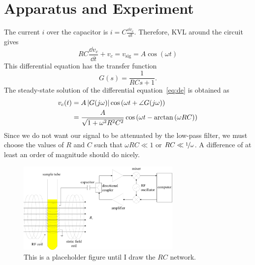 \section{Apparatus and Experiment}

The current $i$ over the capacitor is $i = C\frac{\dd v_c}{\dd t}$. Therefore,
KVL around the circuit gives 
%
\begin{equation}
    RC\frac{\dd v_c}{\dd t} + v_c = v_{\text{sig}} = A \cos{(\omega t)}
    \label{eq:de}
\end{equation} 
%
This differential equation has the transfer function \[ G(s) = \frac{1}
{RCs+1}. \] The steady-state solution of the differential equation~\eqref{eq:de}
is obtained as
%
\begin{align}
    \begin{split}
    v_c(t) &= A\left|{G(j \omega)}\right|\cos{(\omega t + \angle G(j\omega))} \\
           &= \frac{A}{\sqrt{1+\omega^2R^2C^2}}\cos{\left(\omega t -
           \arctan{(\omega R C})\right)}
    \end{split}
    \label{eq:de_sol}
\end{align}
%
Since we do not want our signal to be attenuated by the low-pass filter, we must
choose the values of $R$ and $C$ such that $\omega R C \ll 1$ or $RC \ll
\nicefrac{1}{\omega}$. A difference of at least an order of magnitude should do
nicely.

\begin{figure}[htb]
\includegraphics[width=8cm]{./figures/sample-fig1}
\caption{This is a placeholder figure until I draw the $RC$ network.}
\label{fig:RC}
\end{figure}
